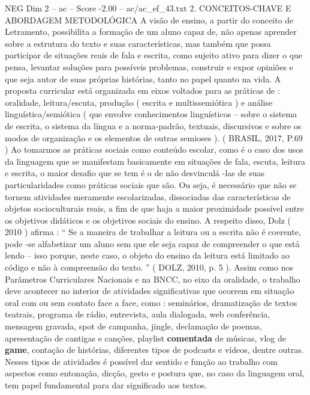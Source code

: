 \begin{textsample}{NEG Dim 2 – ac – Score -2.00 – ac/ac\_ef\_43.txt}  \label{ex:f2_neg_129}
2.
CONCEITOS-CHAVE E ABORDAGEM METODOLÓGICA A visão de ensino, a partir do conceito de Letramento, possibilita a formação de um aluno capaz de, não apenas aprender sobre a estrutura do texto e suas características, mas também que possa participar de situações reais de fala e escrita, como sujeito ativo para dizer o que pensa, levantar soluções para possíveis problemas, construir e expor opiniões e que seja autor de suas próprias histórias, tanto no papel quanto na vida.
A proposta curricular está organizada em eixos voltados para as práticas de : oralidade, leitura/escuta, produção ( escrita e multissemiótica ) e análise linguística/semiótica ( que envolve conhecimentos linguísticos – sobre o sistema de escrita, o sistema da língua e a norma-padrão, textuais, discursivos e sobre os modos de organização e os elementos de outras semioses ). ( BRASIL, 2017, P.69 ) Ao tomarmos as práticas sociais como conteúdo escolar, como é o caso dos usos da linguagem que se manifestam basicamente em situações de fala, escuta, leitura e escrita, o maior desafio que se tem é o de não desvinculá -las de suas particularidades como práticas sociais que são.
Ou seja, é necessário que não se tornem atividades meramente escolarizadas, dissociadas das características de objetos socioculturais reais, a fim de que haja a maior proximidade possível entre os objetivos didáticos e os objetivos sociais do ensino.
A respeito disso, Dolz ( 2010 ) afirma : “ Se a maneira de trabalhar a leitura ou a escrita não é coerente, pode -se alfabetizar um aluno sem que ele seja capaz de compreender o que está lendo – isso porque, neste caso, o objeto do ensino da leitura está limitado ao código e não à compreensão do texto. ” ( DOLZ, 2010, p. 5 ).
Assim como nos Parâmetros Curriculares Nacionais e na BNCC, no eixo da oralidade, o trabalho deve acontecer no interior de atividades significativas que ocorrem em situação oral com ou sem contato face a face, como : seminários, dramatização de textos teatrais, programa de rádio, entrevista, aula dialogada, web conferência, mensagem gravada, spot de campanha, jingle, declamação de poemas, apresentação de cantigas e canções, playlist \textbf{comentada} de músicas, vlog de \textbf{game}, contação de histórias, diferentes tipos de podcasts e vídeos, dentre outras.
Nesses tipos de atividades é possível dar sentido e função ao trabalho com aspectos como entonação, dicção, gesto e postura que, no caso da linguagem oral, tem papel fundamental para dar significado aos textos.

\end{textsample}
